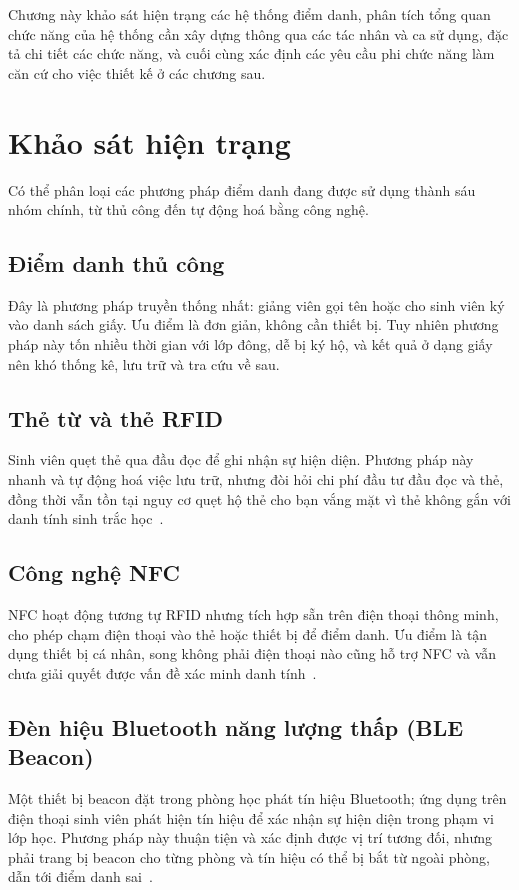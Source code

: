 \documentclass[../main.tex]{subfiles}
\begin{document}
Chương này khảo sát hiện trạng các hệ thống điểm danh, phân tích tổng quan chức năng của hệ
thống cần xây dựng thông qua các tác nhân và ca sử dụng, đặc tả chi tiết các chức năng, và
cuối cùng xác định các yêu cầu phi chức năng làm căn cứ cho việc thiết kế ở các chương sau.

\section{Khảo sát hiện trạng}
\label{sec:khao-sat-he-thong}

Có thể phân loại các phương pháp điểm danh đang được sử dụng thành sáu nhóm chính, từ
thủ công đến tự động hoá bằng công nghệ.

\subsection{Điểm danh thủ công}
Đây là phương pháp truyền thống nhất: giảng viên gọi tên hoặc cho sinh viên ký vào danh
sách giấy. Ưu điểm là đơn giản, không cần thiết bị. Tuy nhiên phương pháp này tốn nhiều
thời gian với lớp đông, dễ bị ký hộ, và kết quả ở dạng giấy nên khó thống kê, lưu trữ và
tra cứu về sau.

\subsection{Thẻ từ và thẻ RFID}
Sinh viên quẹt thẻ qua đầu đọc để ghi nhận sự hiện diện. Phương pháp này nhanh và tự
động hoá việc lưu trữ, nhưng đòi hỏi chi phí đầu tư đầu đọc và thẻ, đồng thời vẫn tồn
tại nguy cơ quẹt hộ thẻ cho bạn vắng mặt vì thẻ không gắn với danh tính sinh trắc
học~\cite{arulogun2013rfid}.

\subsection{Công nghệ NFC}
NFC hoạt động tương tự RFID nhưng tích hợp sẵn trên điện thoại thông minh, cho phép chạm
điện thoại vào thẻ hoặc thiết bị để điểm danh. Ưu điểm là tận dụng thiết bị cá nhân,
song không phải điện thoại nào cũng hỗ trợ NFC và vẫn chưa giải quyết được vấn đề xác
minh danh tính~\cite{nfcforum}.

\subsection{Đèn hiệu Bluetooth năng lượng thấp (BLE Beacon)}
Một thiết bị beacon đặt trong phòng học phát tín hiệu Bluetooth; ứng dụng trên điện thoại
sinh viên phát hiện tín hiệu để xác nhận sự hiện diện trong phạm vi lớp học. Phương pháp
này thuận tiện và xác định được vị trí tương đối, nhưng phải trang bị beacon cho từng
phòng và tín hiệu có thể bị bắt từ ngoài phòng, dẫn tới điểm danh
sai~\cite{apoorv2016ble, ibeacon}.
\end{document}
